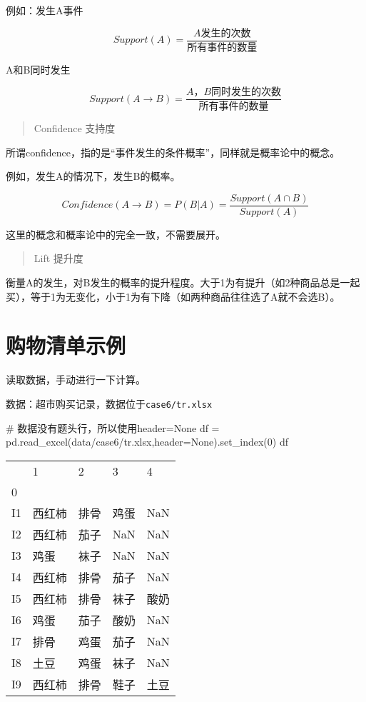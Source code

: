 \documentclass[
  letterpaper,
  DIV=11,
  numbers=noendperiod]{scrreprt}
\newenvironment{Shaded}{\begin{snugshade}}{\end{snugshade}}
\newcommand{\CommentTok}[1]{\textcolor[rgb]{0.37,0.37,0.37}{#1}}
\newcommand{\DecValTok}[1]{\textcolor[rgb]{0.68,0.00,0.00}{#1}}
\newcommand{\NormalTok}[1]{\textcolor[rgb]{0.00,0.23,0.31}{#1}}
\newcommand{\OperatorTok}[1]{\textcolor[rgb]{0.37,0.37,0.37}{#1}}
\newcommand{\StringTok}[1]{\textcolor[rgb]{0.13,0.47,0.30}{#1}}
\newcommand{\VariableTok}[1]{\textcolor[rgb]{0.07,0.07,0.07}{#1}}
\begin{document}
例如：发生A事件

\[
Support(A) = \frac{A发生的次数}{所有事件的数量} 
\]

A和B同时发生

\[
Support(A \rightarrow B) = \frac{A，B同时发生的次数}{所有事件的数量} 
\]

\begin{quote}
Confidence 支持度
\end{quote}

所谓confidence，指的是``事件发生的条件概率''，同样就是概率论中的概念。

例如，发生A的情况下，发生B的概率。

\[
Confidence(A \rightarrow B) = P(B|A) = \frac{Support(A \cap B)}{Support(A)}
\]

这里的概念和概率论中的完全一致，不需要展开。

\begin{quote}
Lift 提升度
\end{quote}

衡量A的发生，对B发生的概率的提升程度。大于1为有提升（如2种商品总是一起买），等于1为无变化，小于1为有下降（如两种商品往往选了A就不会选B）。

\hypertarget{ux8d2dux7269ux6e05ux5355ux793aux4f8b}{%
\section{购物清单示例}\label{ux8d2dux7269ux6e05ux5355ux793aux4f8b}}

读取数据，手动进行一下计算。

数据：超市购买记录，数据位于\texttt{case6/tr.xlsx}

\begin{Shaded}
\begin{Highlighting}[]
\CommentTok{\# 数据没有题头行，所以使用header=None}
\NormalTok{df }\OperatorTok{=}\NormalTok{ pd.read\_excel(}\StringTok{\textquotesingle{}data/case6/tr.xlsx\textquotesingle{}}\NormalTok{,header}\OperatorTok{=}\VariableTok{None}\NormalTok{).set\_index(}\DecValTok{0}\NormalTok{)}
\NormalTok{df}
\end{Highlighting}
\end{Shaded}

\begin{longtable}[]{@{}lllll@{}}
\toprule\noalign{}
& 1 & 2 & 3 & 4 \\
0 & & & & \\
\midrule\noalign{}
\endhead
\bottomrule\noalign{}
\endlastfoot
I1 & 西红柿 & 排骨 & 鸡蛋 & NaN \\
I2 & 西红柿 & 茄子 & NaN & NaN \\
I3 & 鸡蛋 & 袜子 & NaN & NaN \\
I4 & 西红柿 & 排骨 & 茄子 & NaN \\
I5 & 西红柿 & 排骨 & 袜子 & 酸奶 \\
I6 & 鸡蛋 & 茄子 & 酸奶 & NaN \\
I7 & 排骨 & 鸡蛋 & 茄子 & NaN \\
I8 & 土豆 & 鸡蛋 & 袜子 & NaN \\
I9 & 西红柿 & 排骨 & 鞋子 & 土豆 \\
\end{longtable}
\end{document}
